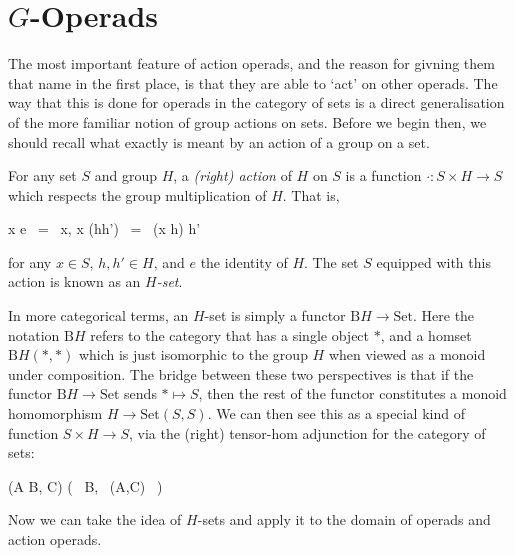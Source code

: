 \section{$G$-Operads}

The most important feature of action operads, and the reason for givning them that name in the first place, is that they are able to `act' on other operads. The way that this is done for operads in the category of sets is a direct generalisation of the more familiar notion of group actions on sets. Before we begin then, we should recall what exactly is meant by an action of a group on a set.

\begin{defn} For any set $S$ and group $H$, a \emph{(right) action} of $H$ on $S$ is a function $\cdot : S \times H \to S$ which respects the group multiplication of $H$. That is,
\begin{eq*} x \cdot e \, = \, x, \quad \quad \quad \quad x \cdot (hh') \, = \, (x \cdot h) \cdot h' \end{eq*}
for any $x \in S$, $h,h' \in H$, and $e$ the identity of $H$. The set $S$ equipped with this action is known as an \emph{$H$-set}.
\end{defn}

In more categorical terms, an $H$-set is simply a functor $\mathrm{B}H \to \mathrm{Set}$. Here the notation $\mathrm{B}H$ refers to the category that has a single object $\ast$, and a homset $\mathrm{B}H(\ast, \ast)$ which is just isomorphic to the group $H$ when viewed as a monoid under composition. The bridge between these two perspectives is that if the functor $\mathrm{B}H \to \mathrm{Set}$ sends $\ast \mapsto S$, then the rest of the functor constitutes a monoid homomorphism $H \to \mathrm{Set}(S, S)$. We can then see this as a special kind of function $S \times H \to S$, via the (right) tensor-hom adjunction for the category of sets:
\begin{eq*} (A \times B, C) \quad \cong \quad {}\big( \, B, \, (A,C) \, \big) \end{eq*}

Now we can take the idea of $H$-sets and apply it to the domain of operads and action operads.

